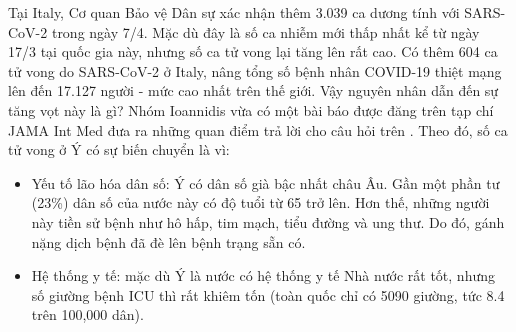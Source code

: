 \documentclass[12pt, a4paper,oneside]{book}
\theoremstyle{definition}
\begin{document}
Tại Italy, Cơ quan Bảo vệ Dân sự xác nhận thêm 3.039 ca dương tính với SARS-CoV-2 trong ngày 7/4. Mặc dù đây là số ca nhiễm mới thấp nhất kể từ ngày 17/3 tại quốc gia này, nhưng số ca tử vong lại tăng lên rất cao. Có thêm 604 ca tử vong do SARS-CoV-2 ở Italy, nâng tổng số bệnh nhân COVID-19 thiệt mạng lên đến 17.127 người - mức cao nhất trên thế giới. Vậy nguyên nhân dẫn đến sự tăng vọt này là gì? Nhóm Ioannidis vừa có một bài báo được đăng trên tạp chí JAMA Int Med đưa ra những quan điểm trả lời cho câu hỏi trên \cite{21}. Theo đó, số ca tử vong ở Ý có sự biến chuyển là vì:
\begin{itemize}
	\item Yếu tố lão hóa dân số: Ý có dân số già bậc nhất châu Âu. Gần một phần tư (23\%) dân số của nước này có độ tuổi từ 65 trở lên. Hơn thế, những người này tiền sử bệnh như hô hấp, tim mạch, tiểu đường và ung thư. Do đó, gánh nặng dịch bệnh đã đè lên bệnh trạng sẵn có.
	\item Hệ thống y tế: mặc dù Ý là nước có hệ thống y tế Nhà nước rất tốt, nhưng số giường bệnh ICU thì rất khiêm tốn (toàn quốc chỉ có 5090 giường, tức 8.4 trên 100,000 dân).
\end{itemize}
\end{document}
